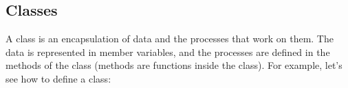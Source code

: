 \begin{sphinxVerbatim}[commandchars=\\\{\}]
   
      \PYGZbs{}
                         \PYGZbs{}
                         \PYGZbs{}
                       

    
\end{sphinxVerbatim}


\subsection{Classes}
\label{\detokenize{lesson/prg/python_intro:classes}}\label{\detokenize{lesson/prg/python_intro:doc-python-intro-sec-classes}}
A class is an encapsulation of data and the processes that work on
them. The data is represented in member variables, and the processes
are defined in the methods of the class (methods are functions inside
the class). For example, let's see how to define a  class:

